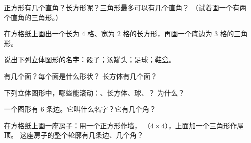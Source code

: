\begin{exercise}[$\star$]\label{exo:g2:shapes:4}
正方形有几个直角？长方形呢？三角形最多可以有几个直角？
（试着画一个有两个直角的三角形。）
\end{exercise}

\begin{exercise}[$\star$]\label{exo:g2:shapes:5}
在方格纸上画出一个长为 $4$ 格、宽为 $2$
格的长方形，再画一个底边为 $3$ 格的三角形。
\end{exercise}

\begin{exercise}[$\star$]\label{exo:g2:shapes:6}
说出下列立体图形的名字：骰子；汤罐头；足球；鞋盒。
\end{exercise}

\begin{exercise}[$\star$]\label{exo:g2:shapes:7}
有几个面？每个面是什么形状？
长方体有几个面？
\end{exercise}

\begin{exercise}[$\star$]\label{exo:g2:shapes:8}
下列立体图形中，哪些能滚动：、长方体、球、？
为什么？
\end{exercise}

\begin{exercise}[$\star$]\label{exo:g2:shapes:9}
一个图形有 $6$ 条边。它叫什么名字？它有几个角？
\end{exercise}

\begin{exercise}[$\star\star$]\label{exo:g2:shapes:10}
在方格纸上画一座房子：用一个正方形作墙，
（$4 \times 4$），上面加一个三角形作屋顶。
这座房子的整个轮廓有几条边、几个角？
\end{exercise}
